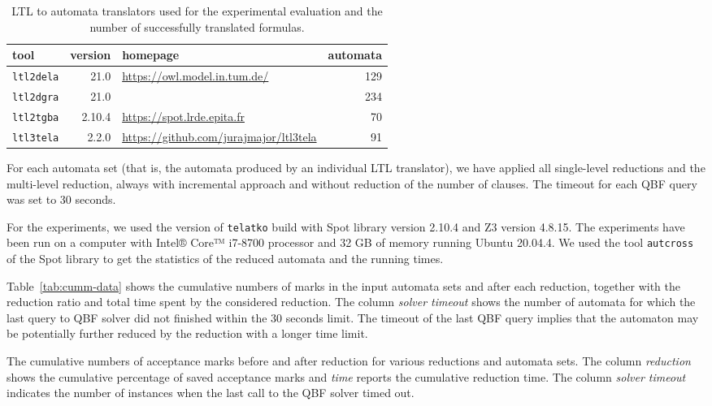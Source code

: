 \documentclass[a4paper,UKenglish,cleveref,autoref,thm-restate]{lipics-v2021}
\begin{document}
\begin{table}[b]
\caption{LTL to automata translators used for the experimental evaluation
and the number of successfully translated formulas.}
\label{tab:ltltranslators}
\centering
\begin{tabular}{lr@{~~~}lr}
\toprule
tool        & version&homepage & automata \\
\midrule
\texttt{ltl2dela} & 21.0 & \multirow{2}{*}{\url{https://owl.model.in.tum.de/}} & 129\\
\texttt{ltl2dgra} & 21.0 & & 234\\
\texttt{ltl2tgba} & 2.10.4 & \url{https://spot.lrde.epita.fr} & 70\\
\texttt{ltl3tela} & 2.2.0  & \url{https://github.com/jurajmajor/ltl3tela} & 91\\
\bottomrule
\end{tabular}
\end{table}

For each automata set (that is, the automata produced by an individual
LTL translator), we have applied all single-level reductions and the
multi-level reduction, always with incremental approach and without
reduction of the number of clauses. The timeout for each QBF query was
set to 30 seconds.

For the experiments, we used the version of \texttt{telatko} build with
Spot library version 2.10.4 and Z3 version 4.8.15. The experiments
have been run on a computer with Intel® Core™ i7-8700 processor and 32
GB of memory running Ubuntu 20.04.4. We used the tool
\texttt{autcross} of the Spot library to get the statistics of the
reduced automata and the running times.

Table~\ref{tab:cumm-data} shows the cumulative numbers of marks in
the input automata sets and after each reduction, together with the
reduction ratio and total time spent by the considered reduction. The
column \textit{solver timeout} shows the number of automata for which
the last query to QBF solver did not finished within the 30 seconds
limit. The timeout of the last QBF query implies that the automaton
may be potentially further reduced by the reduction with a longer time
limit.

\begin{table}[t]
  \caption{The cumulative numbers of acceptance marks before and after
    reduction for various reductions and automata sets. The column
    \emph{reduction} shows the cumulative percentage of saved
    acceptance marks and \emph{time} reports the cumulative reduction
    time. The column \textit{solver timeout} indicates the number of
    instances when the last call to the QBF solver timed out.  }
\label{tab:cumm-data}
\centering
\setlength{\tabcolsep}{10pt}

\end{table}
\end{document}
